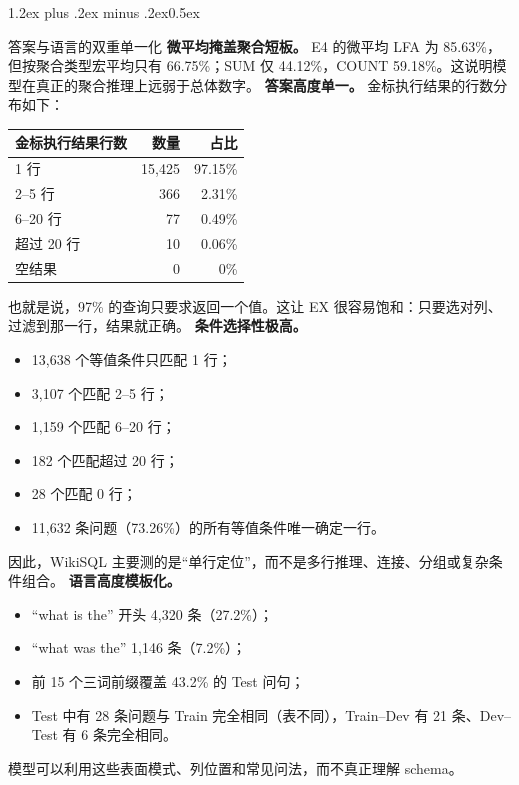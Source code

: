 \documentclass[conference]{IEEEtran}
\makeatletter
\def\subsubsection{\@startsection{subsubsection}{3}{\z@}%
  {1.2ex plus .2ex minus .2ex}{0.5ex}%
  {\normalfont\normalsize\bfseries\raggedright}}
\makeatother
\begin{document}
\subsubsection{答案与语言的双重单一化}
\textbf{微平均掩盖聚合短板。} E4 的微平均 LFA 为 85.63\%，但按聚合类型宏平均只有 66.75\%；SUM 仅 44.12\%，COUNT 59.18\%。这说明模型在真正的聚合推理上远弱于总体数字。
\textbf{答案高度单一。} 金标执行结果的行数分布如下：
\needspace{3.3cm}
\noindent\begin{minipage}{\linewidth}
\centering
\footnotesize
\begin{tabular}{@{}lrr@{}}
\toprule
金标执行结果行数 & 数量 & 占比 \\
\midrule
1 行 & 15,425 & 97.15\% \\
2–5 行 & 366 & 2.31\% \\
6–20 行 & 77 & 0.49\% \\
超过 20 行 & 10 & 0.06\% \\
空结果 & 0 & 0\% \\
\bottomrule
\end{tabular}
\end{minipage}\par\smallskip
也就是说，97\% 的查询只要求返回一个值。这让 EX 很容易饱和：只要选对列、过滤到那一行，结果就正确。
\textbf{条件选择性极高。}
\begin{itemize}
\item 13,638 个等值条件只匹配 1 行；
\item 3,107 个匹配 2–5 行；
\item 1,159 个匹配 6–20 行；
\item 182 个匹配超过 20 行；
\item 28 个匹配 0 行；
\item 11,632 条问题（73.26\%）的所有等值条件唯一确定一行。
\end{itemize}
因此，WikiSQL 主要测的是“单行定位”，而不是多行推理、连接、分组或复杂条件组合。
\textbf{语言高度模板化。}
\begin{itemize}
\item “what is the” 开头 4,320 条（27.2\%）；
\item “what was the” 1,146 条（7.2\%）；
\item 前 15 个三词前缀覆盖 43.2\% 的 Test 问句；
\item Test 中有 28 条问题与 Train 完全相同（表不同），Train–Dev 有 21 条、Dev–Test 有 6 条完全相同。
\end{itemize}
模型可以利用这些表面模式、列位置和常见问法，而不真正理解 schema。
\end{document}

